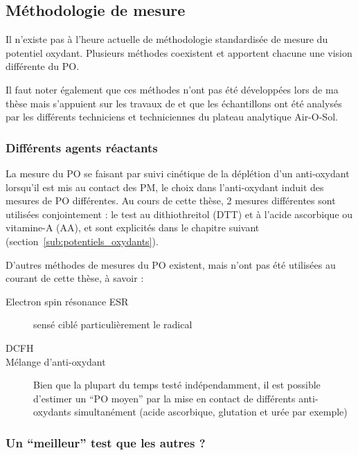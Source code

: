 \subsection{Méthodologie de mesure}%
\label{sub:methodologie_de_mesure}

Il n'existe pas à l'heure actuelle de méthodologie standardisée de mesure du potentiel
oxydant. Plusieurs méthodes coexistent et apportent chacune une vision différente du PO.

Il faut noter également que ces méthodes n'ont pas été développées lors de ma thèse mais
s'appuient sur les travaux de \cite{calasPollution2017} et que les échantillons ont été
analysés par les différents techniciens et techniciennes du plateau analytique Air-O-Sol.

\subsubsection{Différents agents réactants}%
\label{ssub:differents_agent_reactant}

La mesure du PO se faisant par suivi cinétique de la déplétion d'un anti-oxydant
lorsqu'il est mis au contact des PM, le choix dans l'anti-oxydant induit des mesures de PO
différentes. Au cours de cette thèse, 2 mesures différentes sont utilisées conjointement :
le test au dithiothreitol (DTT) et à l'acide ascorbique ou vitamine-A (AA), et sont
explicités dans le chapitre suivant (section~\ref{sub:potentiels_oxydants}).

D'autres méthodes de mesures du PO existent, mais n'ont pas été utilisées au courant de
cette thèse, à savoir :
\begin{description}
    \item[Electron spin résonance ESR] sensé ciblé particulièrement le radical
         \autocite{shiHydroxyl2003,shiTemporal2003}
    \item[DCFH]
    \item[Mélange d'anti-oxydant] Bien que la plupart du temps testé indépendamment, il est
        possible d'estimer un ``PO moyen'' par la mise en contact de différents
        anti-oxydants simultanément (acide ascorbique, glutation et urée par exemple)~\autocite{calasComparison2018}
\end{description}

\subsubsection{Un ``meilleur'' test que les autres ?}%
\label{ssub:un_meilleur_test_que_les_autres_}

